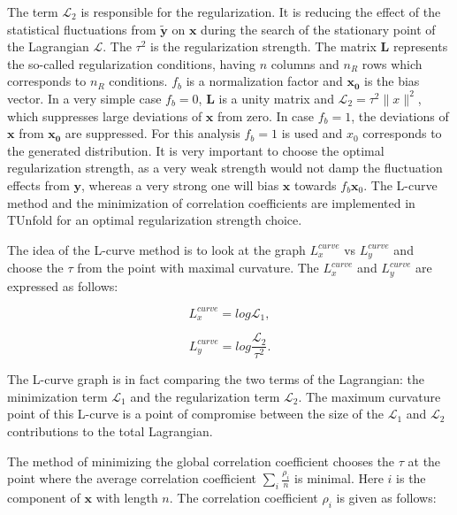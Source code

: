 The term $\mathcal{L}_{2}$ is responsible for the regularization. It is reducing the effect of the statistical fluctuations from $\tilde{\mathbf{y}}$ on $\mathbf{x}$
during the search of the stationary point of the Lagrangian $\mathcal{L}$. The $\tau^{2}$ is the regularization strength. The matrix $\mathbf{L}$
represents the so-called regularization conditions, having $n$ columns and $n_{R}$ rows which corresponds to $n_{R}$ conditions. $f_{b}$ is a normalization 
factor and $\mathbf{x_{0}}$ is the bias vector. In a very simple case $f_{b} = 0$, $\mathbf{L}$ is a unity matrix and $\mathcal{L}_{2} = \tau^{2} \parallel x \parallel^{2}$, which
suppresses large deviations of $\mathbf{x}$ from zero. In case $f_{b} = 1$, the deviations of $\mathbf{x}$ from $\mathbf{x_{0}}$ are
suppressed. For this analysis $f_{b} = 1$ is used and $x_{0}$ corresponds to the generated distribution. It is very important to choose 
the optimal regularization strength, as a very weak strength would not damp the fluctuation effects from $\mathbf{y}$, whereas a very strong 
one will bias $\mathbf{x}$ towards $f_{b}\mathbf{x}_{0}$. The L-curve method \cite{Hansen00thel-curve} and the minimization
of correlation coefficients \cite{VBlobelT} are implemented in TUnfold for an optimal regularization strength choice. 

The idea of the L-curve method is to look at the graph $L_{x}^{curve}$ vs $L_{y}^{curve}$ and choose the $\tau$ from the point with
maximal curvature. The $L_{x}^{curve}$ and $L_{y}^{curve}$ are expressed as follows:

\begin{equation}
 L_{x}^{curve} = log \mathcal{L}_{1},
\end{equation}

\begin{equation}
 L_{y}^{curve} = log \frac{\mathcal{L}_{2}}{\tau^{2}}.
\end{equation}

The L-curve graph is in fact comparing the two terms of the Lagrangian: the minimization term $\mathcal{L}_{1}$ and the regularization term $\mathcal{L}_2$.
The maximum curvature point of this L-curve is a point of compromise between the size of the $\mathcal{L}_{1}$ and $\mathcal{L}_{2}$ contributions
to the total Lagrangian.

The method of minimizing the global correlation coefficient chooses the $\tau$ at the point where the average correlation coefficient 
$\sum_{i} \frac{\rho_{i}}{n}$ is minimal. Here $i$ is the component of $\mathbf{x}$ with length $n$. The correlation coefficient $\rho_{i}$ is given as follows:

